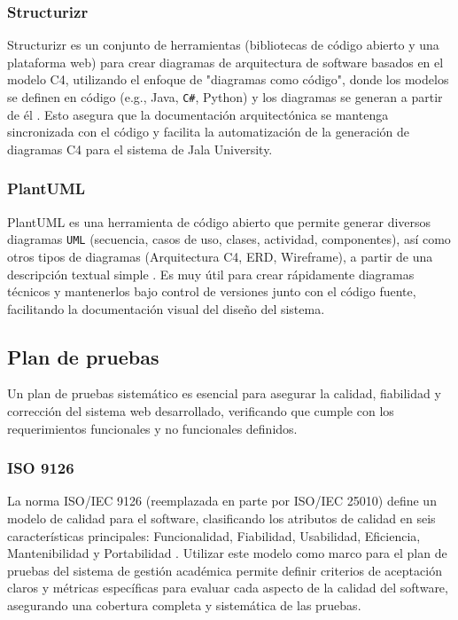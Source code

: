 \subsubsection{Structurizr}
Structurizr es un conjunto de herramientas (bibliotecas de código abierto y una plataforma web) para crear diagramas de arquitectura de software basados en el modelo C4, utilizando el enfoque de "diagramas como código", donde los modelos se definen en código (e.g., Java, \texttt{C\#}, Python) y los diagramas se generan a partir de él \parencite{BrownStructurizr}. Esto asegura que la documentación arquitectónica se mantenga sincronizada con el código y facilita la automatización de la generación de diagramas C4 para el sistema de Jala University.

\subsubsection{PlantUML}
PlantUML es una herramienta de código abierto que permite generar diversos diagramas \texttt{UML} (secuencia, casos de uso, clases, actividad, componentes), así como otros tipos de diagramas (Arquitectura C4, ERD, Wireframe), a partir de una descripción textual simple \parencite{PlantUML}. Es muy útil para crear rápidamente diagramas técnicos y mantenerlos bajo control de versiones junto con el código fuente, facilitando la documentación visual del diseño del sistema.

\subsection{Plan de pruebas}
Un plan de pruebas sistemático es esencial para asegurar la calidad, fiabilidad y corrección del sistema web desarrollado, verificando que cumple con los requerimientos funcionales y no funcionales definidos.

\subsubsection{ISO 9126}
La norma ISO/IEC 9126 (reemplazada en parte por ISO/IEC 25010) define un modelo de calidad para el software, clasificando los atributos de calidad en seis características principales: Funcionalidad, Fiabilidad, Usabilidad, Eficiencia, Mantenibilidad y Portabilidad \parencite{ISO9126}. Utilizar este modelo como marco para el plan de pruebas del sistema de gestión académica permite definir criterios de aceptación claros y métricas específicas para evaluar cada aspecto de la calidad del software, asegurando una cobertura completa y sistemática de las pruebas.